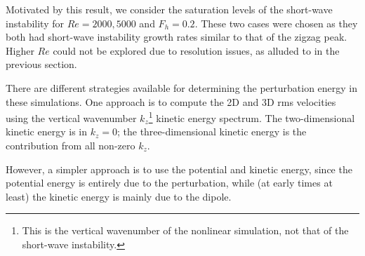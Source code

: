 Motivated by this result, we consider the saturation levels of the short-wave instability for $Re=2000,5000$ and $F_{h}=0.2$. These two cases were chosen as they both had short-wave instability growth rates similar to that of the zigzag peak. Higher $Re$ could not be explored due to resolution issues, as alluded to in the previous section. 

There are different strategies available for determining the perturbation energy in these simulations. One approach is to compute the 2D and 3D rms velocities using the vertical wavenumber $k_{z}$\footnote{This is the vertical wavenumber of the nonlinear simulation, not that of the short-wave instability.} kinetic energy spectrum. The two-dimensional kinetic energy is in $k_{z}=0$; the three-dimensional kinetic energy is the contribution from all non-zero $k_{z}$. 

However, a simpler approach is to use the potential and kinetic energy, since the potential energy is entirely due to the perturbation, while (at early times at least) the kinetic energy is mainly due to the dipole.

